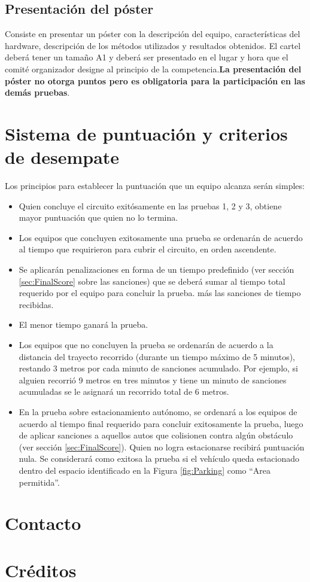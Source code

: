\documentclass[letterpaper,12pt]{article}
\begin{document}
\subsection{Presentación del póster}
Consiste en presentar un póster con la descripción del equipo, características del hardware, descripción de los métodos utilizados y resultados obtenidos. El cartel deberá tener un tamaño A1 y deberá ser presentado en el lugar y hora que el comité organizador designe al principio de la competencia.\textbf{La presentación del póster no otorga puntos pero es obligatoria para la participación en las demás pruebas}.

\section{Sistema de puntuación y criterios de desempate}
Los principios para establecer la puntuación que un equipo alcanza serán simples:
\begin{itemize}
\item Quien concluye el circuito exitósamente en las pruebas 1, 2 y 3, obtiene mayor puntuación que quien no lo termina.
\item Los equipos que concluyen exitosamente una prueba se ordenarán de acuerdo al tiempo que requirieron para cubrir el circuito, en orden ascendente.
\item Se aplicarán penalizaciones en forma de un tiempo predefinido (ver sección \ref{sec:FinalScore} sobre las sanciones) que se deberá sumar al tiempo total requerido por el equipo para concluir la prueba. más las sanciones de tiempo recibidas.
\item El menor tiempo ganará la prueba.
\item Los equipos que no concluyen la prueba se ordenarán de acuerdo a la distancia del trayecto recorrido (durante un tiempo máximo de 5 minutos), restando 3 metros por cada minuto de sanciones acumulado. Por ejemplo, si alguien recorrió 9 metros en tres minutos y tiene un minuto de sanciones acumuladas se le asignará un recorrido total de 6 metros.
\item En la prueba sobre estacionamiento autónomo, se ordenará a los equipos de acuerdo al tiempo final requerido para concluir exitosamente la prueba, luego de aplicar sanciones a aquellos autos que colisionen contra algún obstáculo (ver sección \ref{sec:FinalScore}). Quien no logra estacionarse recibirá puntuación nula. Se considerará como exitosa la prueba si el vehículo queda estacionado dentro del espacio identificado en la Figura \ref{fig:Parking} como “Area permitida”.
\end{itemize}

\section{Contacto}

\section*{Créditos}
\end{document}
